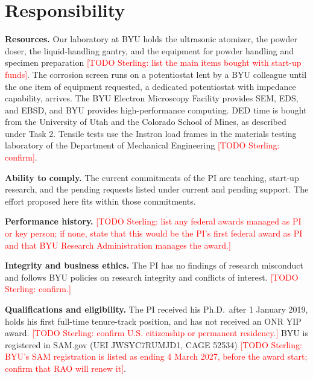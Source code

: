 \documentclass[12pt,letterpaper]{article}
\newcommand{\todo}[1]{\textcolor{red}{[TODO Sterling: #1]}}
\begin{document}
\renewcommand{\thepage}{\arabic{page}}
\setcounter{page}{\value{savedpage}}

\section{Responsibility}

\textbf{Resources.} Our laboratory at BYU holds the ultrasonic atomizer,
the powder doser, the liquid-handling gantry, and the equipment for powder
handling and specimen preparation \todo{list the main items bought with
start-up funds}.
The corrosion screen runs on a potentiostat lent by a BYU colleague until the one item of equipment requested, a dedicated potentiostat with impedance capability, arrives.
The BYU Electron Microscopy Facility provides SEM, EDS, and EBSD, and BYU provides high-performance computing.
DED time is bought from the University of Utah and the Colorado School of Mines, as described under Task 2.
Tensile tests use the Instron load frames in the
materials testing laboratory of the Department of Mechanical Engineering
\todo{confirm}.

\textbf{Ability to comply.} The current commitments of the PI are teaching,
start-up research, and the pending requests listed under current and pending
support. The effort proposed here fits within those commitments.

\textbf{Performance history.} \todo{list any federal awards managed as PI or
key person; if none, state that this would be the PI's first federal award
as PI and that BYU Research Administration manages the award.}

\textbf{Integrity and business ethics.} The PI has no findings of research
misconduct and follows BYU policies on research integrity and conflicts of
interest. \todo{confirm.}

\textbf{Qualifications and eligibility.} The PI received his Ph.D.\ after
1 January 2019, holds his first full-time tenure-track position, and has not
received an ONR YIP award. \todo{confirm U.S. citizenship or permanent
residency.} BYU is registered in SAM.gov (UEI JWSYC7RUMJD1, CAGE 52534)
\todo{BYU's SAM registration is listed as ending 4 March 2027, before the
award start; confirm that RAO will renew it}.
\end{document}
